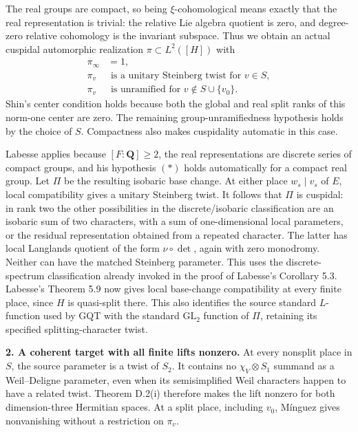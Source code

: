 The real groups are compact, so being \(\xi\)-cohomological means exactly that the real representation is trivial: the relative Lie algebra quotient is zero, and degree-zero relative cohomology is the invariant subspace. Thus we obtain an actual cuspidal automorphic realization \(\pi\subset L^2([H])\) with \[
\begin{aligned}
\pi_\infty&=1,\\
\pi_v&\text{ is a unitary Steinberg twist for }v\in S,\\
\pi_v&\text{ is unramified for }v\notin S\cup\{v_0\}.
\end{aligned}
\] Shin's center condition holds because both the global and real split ranks of this norm-one center are zero. The remaining group-unramifiedness hypothesis holds by the choice of \(S\). Compactness also makes cuspidality automatic in this case.

Labesse applies because \([F:\mathbf Q]\ge2\), the real representations are discrete series of compact groups, and his hypothesis \((*)\) holds automatically for a compact real group. Let \(\Pi\) be the resulting isobaric base change. At either place \(w_s\mid v_s\) of \(E\), local compatibility gives a unitary Steinberg twist. It follows that \(\Pi\) is cuspidal: in rank two the other possibilities in the discrete/isobaric classification are an isobaric sum of two characters, with a sum of one-dimensional local parameters, or the residual representation obtained from a repeated character. The latter has local Langlands quotient of the form \(\nu\circ\det\), again with zero monodromy. Neither can have the matched Steinberg parameter. This uses the discrete-spectrum classification already invoked in the proof of Labesse's Corollary 5.3. Labesse's Theorem 5.9 now gives local base-change compatibility at every finite place, since \(H\) is quasi-split there. This also identifies the source standard \(L\)-function used by GQT with the standard \(\mathrm{GL}_2\) function of \(\Pi\), retaining its specified splitting-character twist.

\textbf{2. A coherent target with all finite lifts nonzero.} At every nonsplit place in \(S\), the source parameter is a twist of \(S_2\). It contains no \(\chi_V\otimes S_1\) summand as a Weil--Deligne parameter, even when its semisimplified Weil characters happen to have a related twist. Theorem D.2(i) therefore makes the lift nonzero for both dimension-three Hermitian spaces. At a split place, including \(v_0\), Mínguez gives nonvanishing without a restriction on \(\pi_v\).

